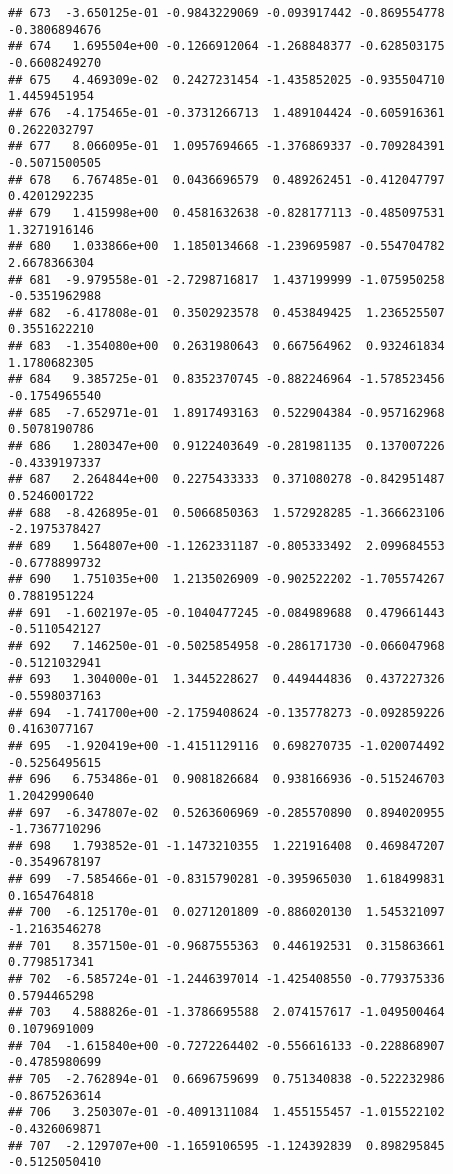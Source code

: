 \documentclass[
]{article}
\begin{document}
\begin{verbatim}
## 673  -3.650125e-01 -0.9843229069 -0.093917442 -0.869554778 -0.3806894676
## 674   1.695504e+00 -0.1266912064 -1.268848377 -0.628503175 -0.6608249270
## 675   4.469309e-02  0.2427231454 -1.435852025 -0.935504710  1.4459451954
## 676  -4.175465e-01 -0.3731266713  1.489104424 -0.605916361  0.2622032797
## 677   8.066095e-01  1.0957694665 -1.376869337 -0.709284391 -0.5071500505
## 678   6.767485e-01  0.0436696579  0.489262451 -0.412047797  0.4201292235
## 679   1.415998e+00  0.4581632638 -0.828177113 -0.485097531  1.3271916146
## 680   1.033866e+00  1.1850134668 -1.239695987 -0.554704782  2.6678366304
## 681  -9.979558e-01 -2.7298716817  1.437199999 -1.075950258 -0.5351962988
## 682  -6.417808e-01  0.3502923578  0.453849425  1.236525507  0.3551622210
## 683  -1.354080e+00  0.2631980643  0.667564962  0.932461834  1.1780682305
## 684   9.385725e-01  0.8352370745 -0.882246964 -1.578523456 -0.1754965540
## 685  -7.652971e-01  1.8917493163  0.522904384 -0.957162968  0.5078190786
## 686   1.280347e+00  0.9122403649 -0.281981135  0.137007226 -0.4339197337
## 687   2.264844e+00  0.2275433333  0.371080278 -0.842951487  0.5246001722
## 688  -8.426895e-01  0.5066850363  1.572928285 -1.366623106 -2.1975378427
## 689   1.564807e+00 -1.1262331187 -0.805333492  2.099684553 -0.6778899732
## 690   1.751035e+00  1.2135026909 -0.902522202 -1.705574267  0.7881951224
## 691  -1.602197e-05 -0.1040477245 -0.084989688  0.479661443 -0.5110542127
## 692   7.146250e-01 -0.5025854958 -0.286171730 -0.066047968 -0.5121032941
## 693   1.304000e-01  1.3445228627  0.449444836  0.437227326 -0.5598037163
## 694  -1.741700e+00 -2.1759408624 -0.135778273 -0.092859226  0.4163077167
## 695  -1.920419e+00 -1.4151129116  0.698270735 -1.020074492 -0.5256495615
## 696   6.753486e-01  0.9081826684  0.938166936 -0.515246703  1.2042990640
## 697  -6.347807e-02  0.5263606969 -0.285570890  0.894020955 -1.7367710296
## 698   1.793852e-01 -1.1473210355  1.221916408  0.469847207 -0.3549678197
## 699  -7.585466e-01 -0.8315790281 -0.395965030  1.618499831  0.1654764818
## 700  -6.125170e-01  0.0271201809 -0.886020130  1.545321097 -1.2163546278
## 701   8.357150e-01 -0.9687555363  0.446192531  0.315863661  0.7798517341
## 702  -6.585724e-01 -1.2446397014 -1.425408550 -0.779375336  0.5794465298
## 703   4.588826e-01 -1.3786695588  2.074157617 -1.049500464  0.1079691009
## 704  -1.615840e+00 -0.7272264402 -0.556616133 -0.228868907 -0.4785980699
## 705  -2.762894e-01  0.6696759699  0.751340838 -0.522232986 -0.8675263614
## 706   3.250307e-01 -0.4091311084  1.455155457 -1.015522102 -0.4326069871
## 707  -2.129707e+00 -1.1659106595 -1.124392839  0.898295845 -0.5125050410

\end{verbatim}
\end{document}
